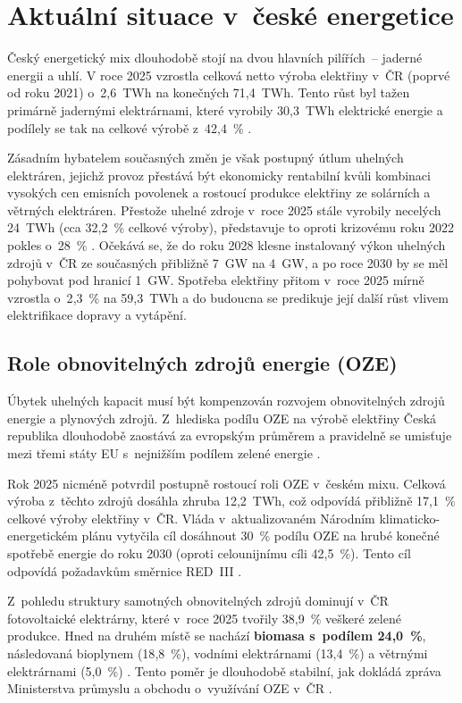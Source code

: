 \section{Aktuální situace v~české energetice}
\label{sec:ceska-energetika}
 
Český energetický mix dlouhodobě stojí na dvou hlavních pilířích~-- jaderné energii a uhlí. V roce 2025 vzrostla celková netto výroba elektřiny v~ČR (poprvé od roku 2021) o~2{,}6~TWh na konečných 71{,}4~TWh. Tento růst byl tažen primárně jadernými elektrárnami, které vyrobily 30{,}3~TWh elektrické energie a podílely se tak na celkové výrobě z~42{,}4~\% \citep{oEnergetice2025}.
 
Zásadním hybatelem současných změn je však postupný útlum uhelných elektráren, jejichž provoz přestává být ekonomicky rentabilní kvůli kombinaci vysokých cen emisních povolenek a rostoucí produkce elektřiny ze solárních a větrných elektráren. Přestože uhelné zdroje v~roce 2025 stále vyrobily necelých 24~TWh (cca 32{,}2~\% celkové výroby), představuje to oproti krizovému roku 2022 pokles o~28~\% \citep{oEnergetice2025}. Očekává se, že do roku 2028 klesne instalovaný výkon uhelných zdrojů v~ČR ze současných přibližně 7~GW na 4~GW, a po roce 2030 by se měl pohybovat pod hranicí 1~GW. Spotřeba elektřiny přitom v~roce 2025 mírně vzrostla o~2{,}3~\% na 59{,}3~TWh a do budoucna se predikuje její další růst vlivem elektrifikace dopravy a vytápění.
 
 
\subsection{Role obnovitelných zdrojů energie (OZE)}
 
Úbytek uhelných kapacit musí být kompenzován rozvojem obnovitelných zdrojů energie a plynových zdrojů. Z~hlediska podílu OZE na výrobě elektřiny Česká republika dlouhodobě zaostává za evropským průměrem a pravidelně se umisťuje mezi třemi státy EU s~nejnižším podílem zelené energie \citep{oEnergetice2025}.
 
Rok 2025 nicméně potvrdil postupně rostoucí roli OZE v~českém mixu. Celková výroba z~těchto zdrojů dosáhla zhruba 12{,}2~TWh, což odpovídá přibližně 17{,}1~\% celkové výroby elektřiny v~ČR. Vláda v~aktualizovaném Národním klimaticko-energetickém plánu vytyčila cíl dosáhnout 30~\% podílu OZE na hrubé konečné spotřebě energie do roku 2030 (oproti celounijnímu cíli 42{,}5~\%). Tento cíl odpovídá požadavkům směrnice RED~III \citep{REDIII2023}.
 
Z~pohledu struktury samotných obnovitelných zdrojů dominují v~ČR fotovoltaické elektrárny, které v~roce 2025 tvořily 38{,}9~\% veškeré zelené produkce. Hned na druhém místě se nachází \textbf{biomasa s~podílem 24{,}0~\%}, následovaná bioplynem (18{,}8~\%), vodními elektrárnami (13{,}4~\%) a větrnými elektrárnami (5{,}0~\%) \citep{oEnergetice2025}. Tento poměr je dlouhodobě stabilní, jak dokládá zpráva Ministerstva průmyslu a obchodu o~využívání OZE v~ČR \citep{MPO2024oze}.
 
